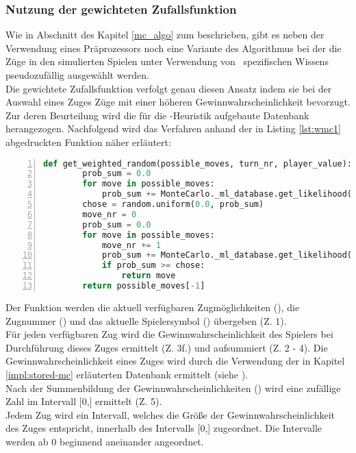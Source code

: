 \subsubsection{Nutzung der gewichteten Zufallsfunktion}
Wie in Abschnitt  des Kapitel \ref{mc_algo} zum  beschrieben, gibt es neben der Verwendung eines Präprozessors noch eine  Variante des Algorithmus bei der die Züge in den simulierten Spielen unter Verwendung von \ot\ spezifischen Wissens pseudozufällig ausgewählt werden. 
\\Die gewichtete Zufallsfunktion verfolgt genau diesen Ansatz indem sie bei der Auswahl eines Zuges Züge mit einer höheren Gewinnwahrscheinlichkeit bevorzugt. Zur deren Beurteilung wird die für die -Heuristik aufgebaute Datenbank herangezogen. Nachfolgend wird das Verfahren anhand der in Listing \ref{lst:wmc1} abgedruckten Funktion näher erläutert:
\begin{lstlisting}[basicstyle=\footnotesize, caption = {get\_weighted\_random Funktion des Monte-Carlo Agenten}, language = python, captionpos = t , numbers=left, label={lst:wmc1}]
    def get_weighted_random(possible_moves, turn_nr, player_value):
        prob_sum = 0.0
        for move in possible_moves:
            prob_sum += MonteCarlo._ml_database.get_likelihood(move,turn_nr,player_value)
        chose = random.uniform(0.0, prob_sum)
        move_nr = 0
        prob_sum = 0.0
        for move in possible_moves:
            move_nr += 1
            prob_sum += MonteCarlo._ml_database.get_likelihood(move,turn_nr,player_value)
            if prob_sum >= chose:
                return move
        return possible_moves[-1]
\end{lstlisting}
Der Funktion werden die aktuell verfügbaren Zugmöglichkeiten (), die Zugnummer () und das aktuelle Spielersymbol () übergeben (Z. 1).
\\Für jeden verfügbaren Zug wird die Gewinnwahrscheinlichkeit des Spielers bei Durchführung dieses Zuges ermittelt (Z. 3f.) und aufsummiert (Z. 2 - 4). Die Gewinnwahrscheinlichkeit eines Zuges wird durch die Verwendung der in Kapitel \ref{impl:stored-mc} erläuterten Datenbank ermittelt (siehe ).
\\Nach der Summenbildung der Gewinnwahrscheinlichkeiten () wird eine zufällige Zahl im Intervall [0,] ermittelt (Z. 5).
\\Jedem Zug wird ein Intervall, welches die Größe der Gewinnwahrscheinlichkeit des Zuges entspricht, innerhalb des Intervalls [0,] zugeordnet. Die Intervalle werden ab 0 beginnend aneinander angeordnet. 
